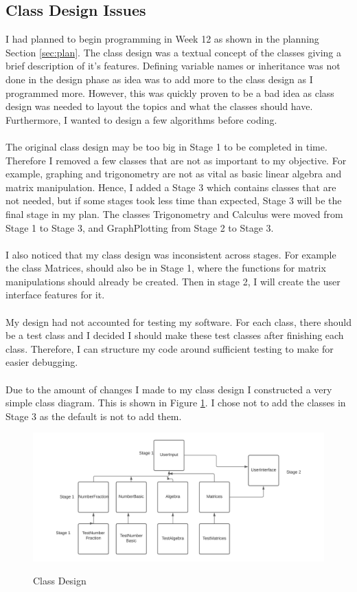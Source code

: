 \documentclass[final]{cmpreport}
\begin{document}
	\subsection{Class Design Issues}
	I had planned to begin programming in Week 12 as shown in the planning Section \ref{sec:plan}. The class design was a textual concept of the classes giving a brief description of it's features. Defining variable names or inheritance was not done in the design phase as idea was to add more to the class design as I programmed more. However, this was quickly proven to be a bad idea as class design was needed to layout the topics and what the classes should have. Furthermore, I wanted to design a few algorithms before coding.\\
	\\The original class design may be too big in Stage 1 to be completed in time. Therefore I removed a few classes that are not as important to my objective. For example, graphing and trigonometry are not as vital as basic linear algebra and matrix manipulation. Hence, I added a Stage 3 which contains classes that are not needed, but if some stages took less time than expected, Stage 3 will be the final stage in my plan. The classes Trigonometry and Calculus were moved from Stage 1 to Stage 3, and GraphPlotting from Stage 2 to Stage 3.\\
	\\I also noticed that my class design was inconsistent across stages. For example the class Matrices, should also be in Stage 1, where the functions for matrix manipulations should already be created. Then in stage 2, I will create the user interface features for it.\\
	\\My design had not accounted for testing my software. For each class, there should be a test class and I decided I should make these test classes after finishing each class. Therefore, I can structure my code around sufficient testing to make for easier debugging.\\
	\\Due to the amount of changes I made to my class design I constructed a very simple class diagram. This is shown in Figure \ref{fig:diag}. I chose not to add the classes in Stage 3 as the default is not to add them.
	\begin{figure}[h!]

		\caption{Class Design}
		\hspace*{-2cm}
		\includegraphics[scale=0.8]{diag.png}
		\label{fig:diag}
	\end{figure}
\end{document}
